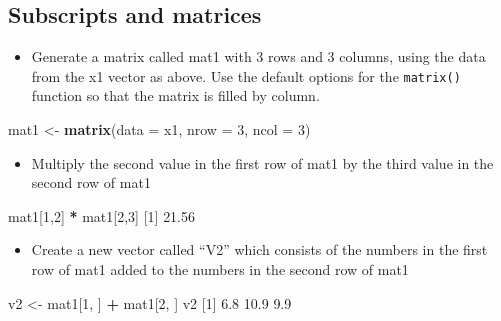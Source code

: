 \documentclass[
]{book}
\newenvironment{Shaded}{\begin{snugshade}}{\end{snugshade}}
\newcommand{\DataTypeTok}[1]{\textcolor[rgb]{0.13,0.29,0.53}{#1}}
\newcommand{\DecValTok}[1]{\textcolor[rgb]{0.00,0.00,0.81}{#1}}
\newcommand{\FloatTok}[1]{\textcolor[rgb]{0.00,0.00,0.81}{#1}}
\newcommand{\KeywordTok}[1]{\textcolor[rgb]{0.13,0.29,0.53}{\textbf{#1}}}
\newcommand{\NormalTok}[1]{#1}
\newcommand{\OperatorTok}[1]{\textcolor[rgb]{0.81,0.36,0.00}{\textbf{#1}}}
\newcommand{\StringTok}[1]{\textcolor[rgb]{0.31,0.60,0.02}{#1}}
\providecommand{\tightlist}{%
  \setlength{\itemsep}{0pt}\setlength{\parskip}{0pt}}
\begin{document}
\hypertarget{subscripts-and-matrices-1}{%
\subsection{Subscripts and matrices}\label{subscripts-and-matrices-1}}

\begin{itemize}
\tightlist
\item
  Generate a matrix called mat1 with 3 rows and 3 columns, using the data from the x1 vector as above. Use the default options for the \texttt{matrix()} function so that the matrix is filled by column.
\end{itemize}

\begin{Shaded}
\begin{Highlighting}[]
\NormalTok{mat1 <-}\StringTok{ }\KeywordTok{matrix}\NormalTok{(}\DataTypeTok{data  =}\NormalTok{ x1, }\DataTypeTok{nrow =} \DecValTok{3}\NormalTok{, }\DataTypeTok{ncol =} \DecValTok{3}\NormalTok{)}
\end{Highlighting}
\end{Shaded}

\begin{itemize}
\tightlist
\item
  Multiply the second value in the first row of mat1 by the third value in the second row of mat1
\end{itemize}

\begin{Shaded}
\begin{Highlighting}[]
\NormalTok{mat1[}\DecValTok{1}\NormalTok{,}\DecValTok{2}\NormalTok{] }\OperatorTok{*}\StringTok{ }\NormalTok{mat1[}\DecValTok{2}\NormalTok{,}\DecValTok{3}\NormalTok{]}
\NormalTok{[}\DecValTok{1}\NormalTok{] }\FloatTok{21.56}
\end{Highlighting}
\end{Shaded}

\begin{itemize}
\tightlist
\item
  Create a new vector called ``V2'' which consists of the numbers in the first row of mat1 added to the numbers in the second row of mat1
\end{itemize}

\begin{Shaded}
\begin{Highlighting}[]
\NormalTok{v2 <-}\StringTok{ }\NormalTok{mat1[}\DecValTok{1}\NormalTok{, ] }\OperatorTok{+}\StringTok{ }\NormalTok{mat1[}\DecValTok{2}\NormalTok{, ]}
\NormalTok{v2       }
\NormalTok{[}\DecValTok{1}\NormalTok{]  }\FloatTok{6.8} \FloatTok{10.9}  \FloatTok{9.9}
\end{Highlighting}
\end{Shaded}
\end{document}
